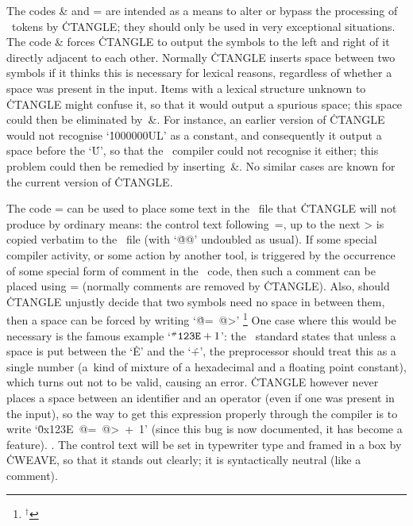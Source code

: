 The codes \:\& and \:= are intended as a means to alter or bypass the
processing of \Cee~tokens by \.{CTANGLE}; they should only be used in very
exceptional situations. The code \:\& forces \.{CTANGLE} to output the
symbols to the left and right of it directly adjacent to each other. Normally
\.{CTANGLE} inserts space between two symbols if it thinks this is necessary
for lexical reasons, regardless of whether a space was present in the input.
Items with a lexical structure unknown to \.{CTANGLE} might confuse it, so
that it would output a spurious space; this space could then be eliminated
by~\:\&. For instance, an earlier version of \.{CTANGLE} would not recognise
`\.{1000000UL}' as a constant, and consequently it output a space before
the `\.U', so that the \Cee~compiler could not recognise it either; this
problem could then be remedied by inserting~\:\&. No similar cases are known
for the current version of \.{CTANGLE}.

The code \:= can be used to place some text in the \Cee~file that \.{CTANGLE}
will not produce by ordinary means: the control text following~\:=, up to
the next \:> is copied verbatim to the \Cee~file (with `\.{@@}' undoubled as
usual). If some special compiler activity, or some action by another tool, is
triggered by the occurrence of some special form of comment in the \Cee~code,
then such a comment can be placed using \:= (normally comments are removed
by \.{CTANGLE}). Also, should \.{CTANGLE} unjustly decide that two symbols
need no space in between them, then a space can be forced by writing
`\hbox{\.{@= @>}}'
\unskip\footnote{${}^\dagger$}
{One case where this would be necessary is the famous example
 `$\T{\^123E}+\T{1}$': the \Cee~standard states that unless a space is put
 between the `\.E' and the `\.+', the preprocessor should treat this as a
 single number (a~kind of mixture of a hexadecimal and a floating point
 constant), which turns out not to be valid, causing an error. \.{CTANGLE}
 however never places a space between an identifier and an operator (even if
 one was present in the input), so the way to get this expression properly
 through the compiler is to write `\hbox{\.{0x123E @= @> + 1}}' (since this
 bug is now documented, it has become a feature).
}.
The control text will be set in typewriter type and
framed in a box by \.{CWEAVE}, so that it stands out clearly; it is
syntactically neutral (like a comment).

